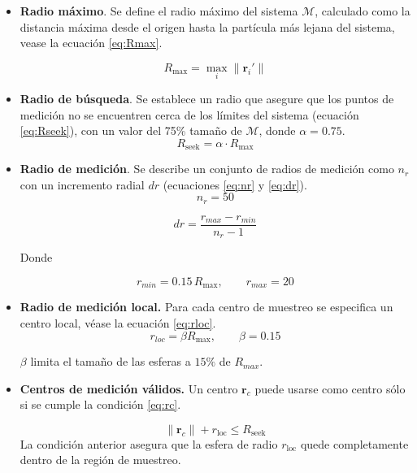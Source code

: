 	\begin{itemize}
		
		\item \textbf{Radio m\'{a}ximo}. Se define el radio m\'{a}ximo del sistema $\mathcal{M}$, calculado como la distancia m\'{a}xima desde el origen hasta la part\'{i}cula m\'{a}s lejana del sistema, vease la ecuaci\'{o}n \ref{eq:Rmax}.
		
		\begin{equation}
			R_{\text{max}} = \max_i \|\mathbf{r}_i'\|
			\label{eq:Rmax}
		\end{equation}
		
		
		\item \textbf{Radio de b\'{u}squeda}. Se establece un radio que asegure que los puntos de medici\'{o}n no se encuentren cerca de los l\'{i}mites del sistema (ecuaci\'{o}n \ref{eq:Rseek}), con un valor del 75\% tamaño de $\mathcal{M}$, donde $\alpha = 0.75$.
		\begin{equation}
			R_{\text{seek}} = \alpha \cdot R_{\text{max}}
			\label{eq:Rseek}
		\end{equation}
		
		
		\item \textbf{Radio de medici\'{o}n}. Se describe un conjunto de radios de medici\'{o}n como $n_{r}$ con un incremento radial $dr$ (ecuaciones \ref{eq:nr} y \ref{eq:dr}).
		\begin{equation}
			n_{r} = 50 
			\label{eq:nr}
		\end{equation}
		
		\begin{equation}
			dr = \frac{r_{max}-r_{min}}{n_{r}-1}
			\label{eq:dr}
		\end{equation}
		
		Donde 
		
		\begin{equation}
			r_{min} = 0.15\, R_{\text{max}}, \qquad
			r_{max} = 20
			\label{eq:rmaxymin}
		\end{equation}
		
		
		\item \textbf{Radio de medici\'{o}n local.} Para cada centro de muestreo se especifica
		un centro local, v\'{e}ase la ecuaci\'{o}n \ref{eq:rloc}.
		\begin{equation}
			r_{loc} = \beta R_{\text{max}}, \qquad \beta = 0.15
			\label{eq:rloc}
		\end{equation} 
		
		$\beta$ limita el tamaño de las esferas a $15\%$ de $R_{max}$.
		
		\item \textbf{Centros de medici\'{o}n v\'{a}lidos.} 
		Un centro $\mathbf{r}_c$ puede usarse como centro s\'{o}lo si se cumple la condici\'{o}n \ref{eq:rc}. 
		
		\begin{equation}
			\|\mathbf{r}_c\| + r_{\mathrm{loc}} \le R_{\text{seek}}
			\label{eq:rc}
		\end{equation}
		La condici\'{o}n anterior asegura que la esfera de radio $r_{\text{loc}}$ quede completamente dentro de la regi\'{o}n de muestreo.
		\end{itemize}

